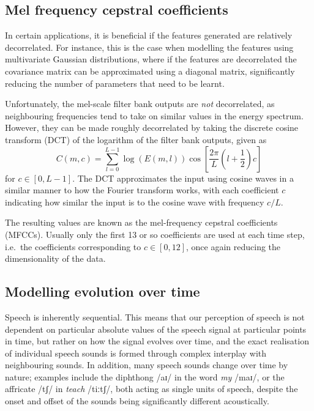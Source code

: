 \subsection{Mel frequency cepstral coefficients}

In certain applications, it is beneficial if the features generated are relatively decorrelated.
For instance, this is the case when modelling the features using multivariate Gaussian distributions, where if the features are decorrelated the covariance matrix can be approximated using a diagonal matrix, significantly reducing the number of parameters that need to be learnt.

Unfortunately, the mel-scale filter bank outputs are \emph{not} decorrelated, as neighbouring frequencies tend to take on similar values in the energy spectrum.
However, they can be made roughly decorrelated by taking the discrete cosine transform (DCT) of the logarithm of the filter bank outputs, given as
\begin{equation}
C(m,c) = \sum_{l=0}^{L-1} \log(E(m,l)) \cos\left[\frac{2\pi}{L}\left(l+\frac{1}{2}\right)c\right]
\end{equation}
for $c \in [0, L - 1]$.
The DCT approximates the input using cosine waves in a similar manner to how the Fourier transform works, with each coefficient $c$ indicating how similar the input is to the cosine wave with frequency $c/L$.

The resulting values are known as the mel-frequency cepstral coefficients (MFCCs).
Usually only the first 13 or so coefficients are used at each time step, i.e.\ the coefficients corresponding to $c \in [0, 12]$, once again reducing the dimensionality of the data.

\subsection{Modelling evolution over time}

Speech is inherently sequential.
This means that our perception of speech is not dependent on particular absolute values of the speech signal at particular points in time, but rather on how the signal evolves over time, and the exact realisation of individual speech sounds is formed through complex interplay with neighbouring sounds.
In addition, many speech sounds change over time by nature; examples include the diphthong /aɪ/ in the word \emph{my} /maɪ/, or the affricate /tʃ/ in \emph{teach} /tiːtʃ/, both acting as single units of speech, despite the onset and offset of the sounds being significantly different acoustically.

